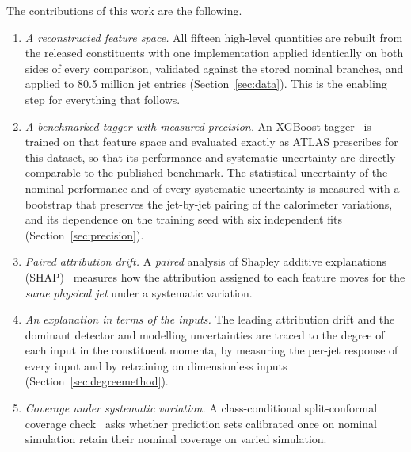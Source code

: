 \documentclass[pdflatex,sn-mathphys,Numbered,iicol]{sn-jnl}
\begin{document}
The contributions of this work are the following.
\begin{enumerate}
\item \emph{A reconstructed feature space.} All fifteen high-level quantities are
  rebuilt from the released constituents with one implementation applied identically
  on both sides of every comparison, validated against the stored nominal branches,
  and applied to 80.5 million jet entries (Section~\ref{sec:data}). This is the
  enabling step for everything that follows.
\item \emph{A benchmarked tagger with measured precision.} An XGBoost
  tagger~\cite{Chen2016,Friedman2001} is trained on that feature space and evaluated
  exactly as ATLAS prescribes for this dataset, so that its performance and systematic
  uncertainty are directly comparable to the published benchmark. The statistical
  uncertainty of the nominal performance and of every systematic uncertainty is
  measured with a bootstrap that preserves the jet-by-jet pairing of the calorimeter variations, and its
  dependence on the training seed with six independent fits
  (Section~\ref{sec:precision}).
\item \emph{Paired attribution drift.} A \emph{paired} analysis of Shapley additive
  explanations (SHAP)~\cite{Lundberg2017,Lundberg2020trees} measures how the
  attribution assigned to each feature moves for the \emph{same physical jet} under a
  systematic variation.
\item \emph{An explanation in terms of the inputs.} The leading attribution drift
  and the dominant detector and modelling uncertainties are traced to the degree of
  each input in the constituent momenta, by measuring the per-jet response of every input and by retraining on
  dimensionless inputs (Section~\ref{sec:degreemethod}).
\item \emph{Coverage under systematic variation.} A class-conditional split-conformal
  coverage check~\cite{Vovk2005,Angelopoulos2023} asks whether prediction sets
  calibrated once on nominal simulation retain their nominal coverage on varied
  simulation.
\end{enumerate}
\end{document}
